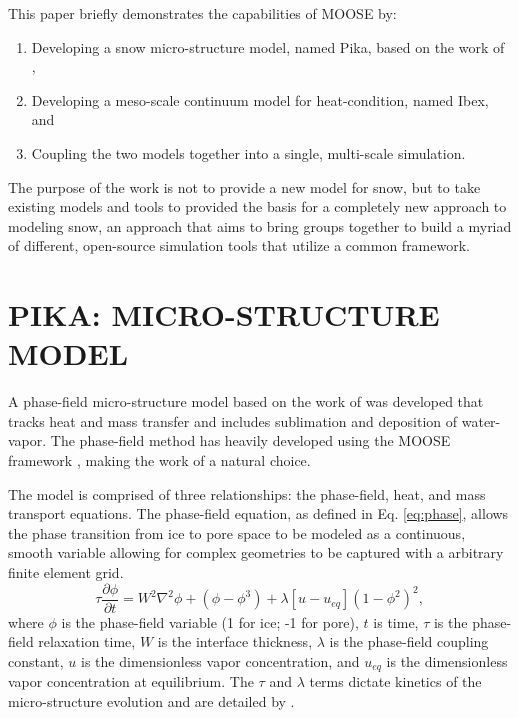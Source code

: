 This paper briefly demonstrates the capabilities of MOOSE by:
\begin{enumerate}
\item Developing a snow micro-structure model, named Pika, based on the work of \citet{kaempfer2009phase},
\item Developing a meso-scale continuum model for heat-condition, named Ibex, and
\item Coupling the two models together into a single, multi-scale simulation.
\end{enumerate}

The purpose of the work is not to provide a new model for snow, but to take existing models and tools to provided the basis for a completely new approach to modeling snow, an approach that aims to bring groups together to build a myriad of different, open-source simulation tools that utilize a common framework.

\section{PIKA: MICRO-STRUCTURE MODEL}\label{sec:pika}
A phase-field micro-structure model based on the work of \citet{kaempfer2009phase} was developed that tracks heat and mass transfer and includes sublimation and deposition of water-vapor. The phase-field method has heavily developed using the MOOSE framework \citep{tonks2012object}, making the work of \citet{kaempfer2009phase} a natural choice.

The model is comprised of three relationships: the phase-field, heat, and mass transport equations. The phase-field equation, as defined in Eq. \eqref{eq:phase}, allows the phase transition from ice to pore space to be modeled as a continuous, smooth variable allowing for complex geometries to be captured with a arbitrary finite element grid.
\begin{equation}\label{eq:phase}
\tau \frac{\partial \phi}{\partial t} = W^2 \nabla^2 \phi +(\phi-\phi^3)+\lambda[u-u_{eq}](1-\phi^2)^2,
\end{equation}
where $\phi$ is the phase-field variable (1 for ice; -1 for pore), $t$ is time, $\tau$ is the phase-field relaxation time, $W$ is the interface thickness, $\lambda$ is the phase-field coupling constant, $u$ is the dimensionless vapor concentration, and $u_{eq}$ is the dimensionless vapor concentration at equilibrium. The $\tau$ and $\lambda$ terms dictate kinetics of the micro-structure evolution and are detailed by \citet{kaempfer2009phase}.

